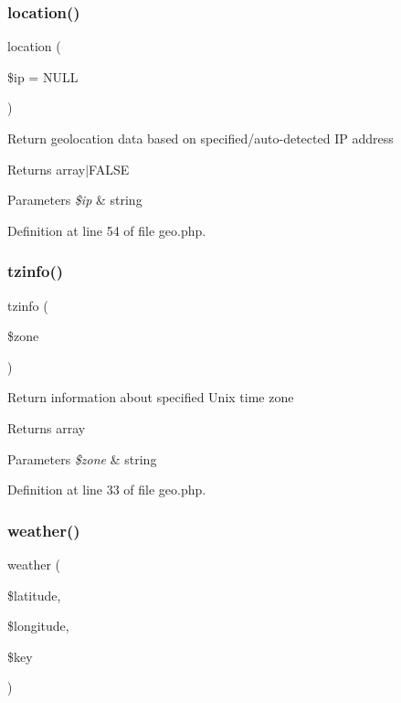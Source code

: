 \subsubsection{\texorpdfstring{location()}{location()}}
{\footnotesize\ttfamily location (\begin{DoxyParamCaption}\item[{}]{\$ip = {\ttfamily NULL} }\end{DoxyParamCaption})}

Return geolocation data based on specified/auto-\/detected IP address \begin{DoxyReturn}{Returns}
array$\vert$\+F\+A\+L\+SE 
\end{DoxyReturn}

\begin{DoxyParams}{Parameters}
{\em \$ip} & string \\
\hline
\end{DoxyParams}


Definition at line 54 of file geo.\+php.

\hypertarget{class_web_1_1_geo_a81cf6bb2edc32c23fb528d32adaac50c}{}\label{class_web_1_1_geo_a81cf6bb2edc32c23fb528d32adaac50c} 
\subsubsection{\texorpdfstring{tzinfo()}{tzinfo()}}
{\footnotesize\ttfamily tzinfo (\begin{DoxyParamCaption}\item[{}]{\$zone }\end{DoxyParamCaption})}

Return information about specified Unix time zone \begin{DoxyReturn}{Returns}
array 
\end{DoxyReturn}

\begin{DoxyParams}{Parameters}
{\em \$zone} & string \\
\hline
\end{DoxyParams}


Definition at line 33 of file geo.\+php.

\hypertarget{class_web_1_1_geo_a258565515125ab61c663b70102946129}{}\label{class_web_1_1_geo_a258565515125ab61c663b70102946129} 
\subsubsection{\texorpdfstring{weather()}{weather()}}
{\footnotesize\ttfamily weather (\begin{DoxyParamCaption}\item[{}]{\$latitude,  }\item[{}]{\$longitude,  }\item[{}]{\$key }\end{DoxyParamCaption})}

